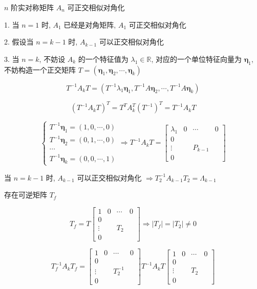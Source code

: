 \begin{theorem}[实对称矩阵的相似对角化]
	$n$ 阶实对称矩阵 $A_{n}$ 可正交相似对角化

	1. 当 $n = 1$ 时, $A_{1}$ 已经是对角矩阵, $A_{1}$ 可正交相似对角化

	2. 假设当 $n = k - 1$ 时, $A_{k-1}$ 可以正交相似对角化

	3. 当 $n = k$, 不妨设 $A_{k}$ 的一个特征值为 $\lambda_{1}\in \mathbb{R}$, 对应的一个单位特征向量为 $\boldsymbol{\eta}_{1}$, 
	不妨构造一个正交矩阵 $T = (\boldsymbol{\eta}_{1}, \boldsymbol{\eta}_{2}, \cdots, \boldsymbol{\eta}_{k})$

	$$T^{-1}A_{k}T = (T^{-1}\lambda_{1}\boldsymbol{\eta}_{1}, T^{-1}A\boldsymbol{\eta}_{2}, \cdots, T^{-1}A\boldsymbol{\eta}_{k})$$

	$$(T^{-1}A_{k}T)^{T} = T^{T}A_{k}^{T}(T^{-1})^{T} = T^{-1}A_{k}T$$

	$$\begin{cases}
	  T^{-1}\boldsymbol{\eta}_{1} = (1, 0, \cdots, 0)\\
	  T^{-1}\boldsymbol{\eta}_{2} = (0, 1, \cdots, 0)\\
	  \cdots\\
	  T^{-1}\boldsymbol{\eta}_{k} = (0, 0, \cdots, 1)
	\end{cases}\Rightarrow
	T^{-1}A_{k}T = 
	\begin{bmatrix}
		\lambda_{1} & 0 & \cdots  & 0\\
		0           &   &         & \\
		\vdots      &   & P_{k-1} & \\
		0           &   &         &  
	\end{bmatrix}$$

	当 $n = k - 1$ 时, $A_{k-1}$ 可以正交相似对角化 $\Rightarrow T_{2}^{-1}A_{k-1}T_{2} = \varLambda_{k-1}$

	存在可逆矩阵 $T_{f}$

	$$T_{f} = T
	\begin{bmatrix}
		1           & 0 & \cdots & 0\\
		0           &   &        & \\
		\vdots      &   & T_{2}  & \\
		0           &   &        &
	\end{bmatrix}\Rightarrow |T_{f}| = |T_{2}|\neq 0$$

	$$T_{f}^{-1}A_{k}T_{f} = 
	\begin{bmatrix}
		1           & 0 & \cdots     & 0\\
		0           &   &            & \\
		\vdots      &   & T_{2}^{-1} & \\
		0           &   &            &
	\end{bmatrix}T^{-1}A_{k}T
	\begin{bmatrix}
		1           & 0 & \cdots & 0\\
		0           &   &        & \\
		\vdots      &   & T_{2}  & \\
		0           &   &        &
	\end{bmatrix}$$


\end{theorem}
